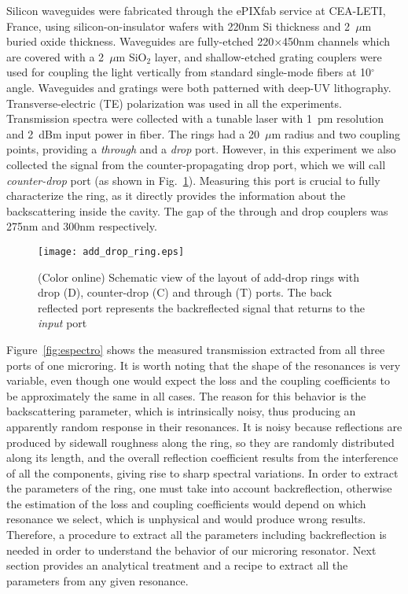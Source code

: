 Silicon waveguides were fabricated through the ePIXfab service at CEA-LETI, France, using silicon-on-insulator  wafers with 220nm Si thickness and 2~$\mu$m buried oxide thickness. Waveguides are fully-etched 220$\times$450nm channels which are covered with a 2~$\mu\textrm{m}$ SiO$_2$ layer, and shallow-etched grating couplers were used for coupling the light vertically from standard single-mode fibers at 10$^\circ$ angle. Waveguides and gratings were both patterned with deep-UV lithography. Transverse-electric (TE) polarization was used in all the experiments. Transmission spectra were collected with a tunable laser with 1~pm resolution and 2~dBm input power in fiber. The rings had a 20~$\mu$m radius and two coupling points, providing a \emph{through} and a  \emph{drop} port. However, in this experiment we also collected the signal from the counter-propagating drop port, which we will call \emph{counter-drop} port (as shown in Fig.~\ref{fig:add_drop_ring}). Measuring this port is crucial to fully characterize the ring, as it directly provides the information about the backscattering inside the cavity. The gap of the through and drop couplers was 275nm and 300nm respectively. 
\begin{figure}
    \centering
    \texttt{[image: add\_drop\_ring.eps]}
    \caption{(Color online) Schematic view of the layout of add-drop rings with drop (D), counter-drop (C) and through (T) ports. The back reflected port represents the backreflected signal that returns to the \emph{input} port }
    \label{fig:add_drop_ring}
\end{figure}

Figure~\ref{fig:espectro} shows the measured transmission extracted from all three ports of one microring. It is worth noting that the shape of the resonances is very variable, even though one would expect the loss and the coupling coefficients to be approximately the same in all cases. The reason for this behavior is the backscattering parameter, which is intrinsically noisy, thus producing an apparently random response in their resonances. It is noisy because reflections are produced by sidewall roughness along the ring, so they are randomly distributed along its length, and the overall reflection coefficient results from the interference of all the components, giving rise to sharp spectral variations. In order to extract the parameters of the ring, one must take into account backreflection, otherwise the estimation of the loss and coupling coefficients would depend on which resonance we select, which is unphysical and would produce wrong results. Therefore, a procedure to extract all the parameters including backreflection is needed in order to understand the behavior of our microring resonator. Next section provides an analytical treatment and a recipe to extract all the parameters from any given resonance.

